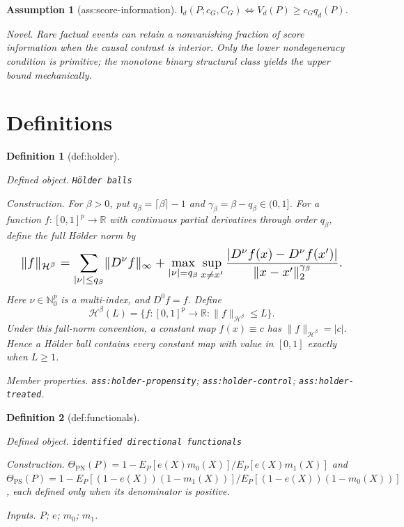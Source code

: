 \documentclass{article}
\newtheorem{assumption}{Assumption}
\newtheorem{definition}{Definition}
\begin{document}
\begin{assumption}[ass:score-information]\label{ass:score-information}
\(\mathsf I_d(P;c_G,C_G)\Longleftrightarrow V_d(P)\ge c_Gq_d(P)\).
\par\smallskip\noindent\emph{Novel.} Rare factual events can retain a nonvanishing fraction of score information when the causal contrast is interior. Only the lower nondegeneracy condition is primitive; the monotone binary structural class yields the upper bound mechanically.
\end{assumption}

\section{Definitions}

\begin{definition}[def:holder]\label{def:holder}
\par\smallskip\noindent\emph{Defined object.} \texttt{Hölder balls}
\par\smallskip\noindent\emph{Construction.} For \(\beta>0\), put \(q_\beta=\lceil\beta\rceil-1\) and \(\gamma_\beta=\beta-q_\beta\in(0,1]\). For a function \(f:[0,1]^p\to\mathbb R\) with continuous partial derivatives through order \(q_\beta\), define the full H\"older norm by
\[
\makebox[\linewidth][c]{\resizebox{0.98\linewidth}{!}{\par\noindent \makebox[\linewidth][c]{\resizebox{0.98\linewidth}{!}{\(\displaystyle \displaystyle \lVert f\rVert_{\mathcal H^\beta}=\sum_{|\nu|\le q_\beta}\lVert D^\nu f\rVert_\infty+\max_{|\nu|=q_\beta}\sup_{x\ne x'}\frac{|D^\nu f(x)-D^\nu f(x')|}{\lVert x-x'\rVert_2^{\gamma_\beta}}.\)}}\par\noindent}}
\]
Here \(\nu\in\mathbb N_0^p\) is a multi-index, and \(D^0f=f\). Define
\[\mathcal H^\beta(L)=\{f:[0,1]^p\to\mathbb R:\lVert f\rVert_{\mathcal H^\beta}\le L\}.\]
Under this full-norm convention, a constant map \(f(x)\equiv c\) has \(\lVert f\rVert_{\mathcal H^\beta}=|c|\). Hence a H\"older ball contains every constant map with value in \([0,1]\) exactly when \(L\ge1\).
\par\smallskip\noindent\emph{Member properties.} \texttt{ass:\allowbreak{}holder-\allowbreak{}propensity}; \texttt{ass:\allowbreak{}holder-\allowbreak{}control}; \texttt{ass:\allowbreak{}holder-\allowbreak{}treated}.
\end{definition}

\begin{definition}[def:functionals]\label{def:functionals}
\par\smallskip\noindent\emph{Defined object.} \texttt{identified directional functionals}
\par\smallskip\noindent\emph{Construction.} \(\Theta_{\mathrm{PN}}(P)=1-E_P[e(X)m_0(X)]/E_P[e(X)m_1(X)]\) and \(\Theta_{\mathrm{PS}}(P)=1-E_P[(1-e(X))(1-m_1(X))]/E_P[(1-e(X))(1-m_0(X))]\), each defined only when its denominator is positive.
\par\smallskip\noindent\emph{Inputs.} \(P\); \(e\); \(m_0\); \(m_1\).
\end{definition}
\end{document}
